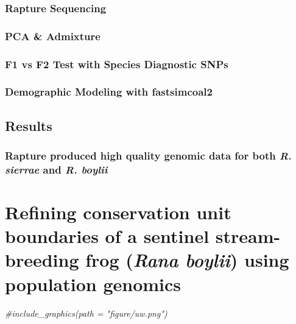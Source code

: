 \documentclass[twoside,12pt,final]{ucthesis-CA2012} %
\newenvironment{Shaded}{}{}
\newcommand{\CommentTok}[1]{\textcolor[rgb]{0.38,0.63,0.69}{\textit{{#1}}}}
\begin{document}
\begin{ucmainmatter}
{\subsection{Rapture Sequencing}\label{rapture-sequencing-1}}

\hypertarget{pca-admixture}{%
\subsection{PCA \& Admixture}\label{pca-admixture}}

\hypertarget{f1-vs-f2-test-with-species-diagnostic-snps}{%
\subsection{F1 vs F2 Test with Species Diagnostic
SNPs}\label{f1-vs-f2-test-with-species-diagnostic-snps}}

\hypertarget{demographic-modeling-with-fastsimcoal2}{%
\subsection{Demographic Modeling with
fastsimcoal2}\label{demographic-modeling-with-fastsimcoal2}}

\hypertarget{results-1}{%
\section{Results}\label{results-1}}

\hypertarget{rapture-produced-high-quality-genomic-data-for-both-r.-sierrae-and-r.-boylii}{%
\subsection{\texorpdfstring{Rapture produced high quality genomic data
for both \emph{R. sierrae} and \emph{R.
boylii}}{Rapture produced high quality genomic data for both R. sierrae and R. boylii}}\label{rapture-produced-high-quality-genomic-data-for-both-r.-sierrae-and-r.-boylii}}

\hypertarget{rangewide}{%
\chapter{\texorpdfstring{Refining conservation unit boundaries of a
sentinel stream-breeding frog (\emph{Rana boylii}) using population
genomics}{Refining conservation unit boundaries of a sentinel stream-breeding frog (Rana boylii) using population genomics}}\label{rangewide}}
\begin{Shaded}
\begin{Highlighting}[]
\CommentTok{#include_graphics(path = "figure/uw.png")}


\end{Highlighting}
\end{Shaded}
\end{ucmainmatter}
\end{document}
